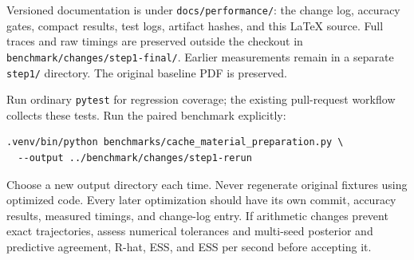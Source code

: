 \documentclass[11pt]{article}
\begin{document}
Versioned documentation is under \texttt{docs/performance/}: the change log,
accuracy gates, compact results, test logs, artifact hashes, and this LaTeX
source. Full traces and raw timings are preserved outside the checkout in
\texttt{benchmark/changes/step1-final/}. Earlier measurements remain in a separate
\texttt{step1/} directory. The original baseline PDF is preserved.

Run ordinary \texttt{pytest} for regression coverage; the existing pull-request
workflow collects these tests. Run the paired benchmark explicitly:
\begin{verbatim}
.venv/bin/python benchmarks/cache_material_preparation.py \
  --output ../benchmark/changes/step1-rerun
\end{verbatim}
Choose a new output directory each time. Never regenerate original fixtures
using optimized code. Every later optimization should have its own commit,
accuracy results, measured timings, and change-log entry. If arithmetic changes
prevent exact trajectories, assess numerical tolerances and multi-seed posterior
and predictive agreement, R-hat, ESS, and ESS per second before accepting it.
\end{document}
